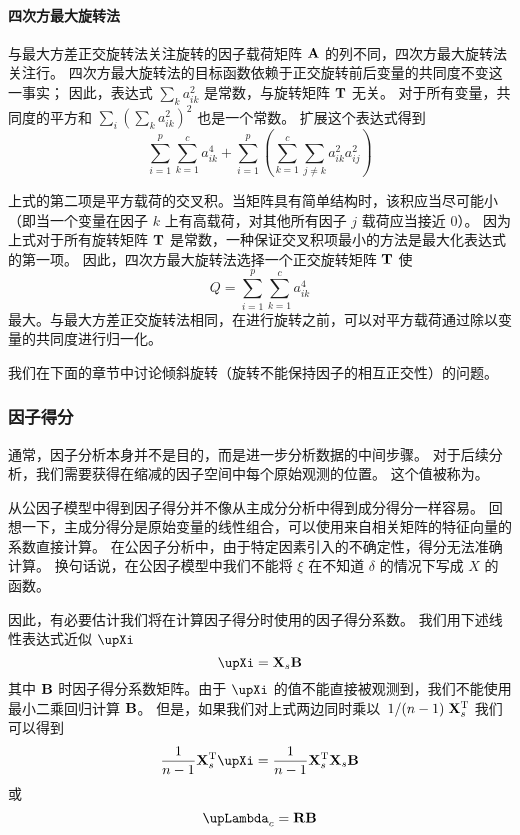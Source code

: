 \paragraph{四次方最大旋转法}
与最大方差正交旋转法关注旋转的因子载荷矩阵 $ \mathbf{A} $ 的列不同，四次方最大旋转法关注行。
四次方最大旋转法的目标函数依赖于正交旋转前后变量的共同度不变这一事实；
因此，表达式 $ \sum_k a_{ik}^2 $ 是常数，与旋转矩阵 $ \mathbf{T} $ 无关。
对于所有变量，共同度的平方和 $ \sum_i(\sum_k a_{ik}^2)^2 $ 也是一个常数。
扩展这个表达式得到
\begin{equation}
    \sum_{i=1}^{p}\sum_{k=1}^{c} a_{ik}^4 + \sum_{i=1}^{p}\left(\sum_{k=1}^{c}\sum_{j\neq k}a_{ik}^2a_{ij}^2\right)
\end{equation}

上式的第二项是平方载荷的交叉积。当矩阵具有简单结构时，该积应当尽可能小
（即当一个变量在因子 $ k $ 上有高载荷，对其他所有因子 $ j $ 载荷应当接近 0）。
因为上式对于所有旋转矩阵 $ \mathbf{T} $ 是常数，一种保证交叉积项最小的方法是最大化表达式的第一项。
因此，四次方最大旋转法选择一个正交旋转矩阵 $ \mathbf{T} $ 使
\begin{equation}
    Q = \sum_{i=1}^{p}\sum_{k=1}^{c} a_{ik}^4
\end{equation}
最大。与最大方差正交旋转法相同，在进行旋转之前，可以对平方载荷通过除以变量的共同度进行归一化。

我们在下面的章节中讨论倾斜旋转（旋转不能保持因子的相互正交性）的问题。

\subsubsection{因子得分}

通常，因子分析本身并不是目的，而是进一步分析数据的中间步骤。
对于后续分析，我们需要获得在缩减的因子空间中每个原始观测的位置。
这个值被称为。

从公因子模型中得到因子得分并不像从主成分分析中得到成分得分一样容易。
回想一下，主成分得分是原始变量的线性组合，可以使用来自相关矩阵的特征向量的系数直接计算。
在公因子分析中，由于特定因素引入的不确定性，得分无法准确计算。
换句话说，在公因子模型中我们不能将 $ \xi $ 在不知道 $ \delta $ 的情况下写成 $ X $ 的函数。

因此，有必要估计我们将在计算因子得分时使用的因子得分系数。
我们用下述线性表达式近似 $ \vXi $ 
\begin{equation}\label{equ:EFA-Xi-approximate}
    \vXi = \vX_s\vB
\end{equation}
其中 $ \mathbf{B} $ 时因子得分系数矩阵。由于 $ \vXi $ 的值不能直接被观测到，我们不能使用最小二乘回归计算 $ \mathbf{B} $。
但是，如果我们对上式两边同时乘以 $ \left. {1} \middle/ {(n-1)} \right.\mathbf{X}_s^\mathrm{T} $ 我们可以得到
\begin{equation}
    \frac{1}{n-1}\vX_s\T\vXi = \frac{1}{n-1}\vX_s\T\vX_s\vB
\end{equation}
或
\begin{equation}
    \vLambda_c = \vR\vB
\end{equation}


